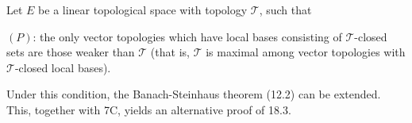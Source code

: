 Let $E$ be a linear topological space with topology $\mathcal{T}$, such that

$(P)$: the only vector topologies which have local bases consisting of $\mathcal{T}$-closed sets are those weaker than $\mathcal{T}$ (that is, $\mathcal{T}$ is maximal among vector topologies with $\mathcal{T}$-closed local bases).

Under this condition, the Banach-Steinhaus theorem (12.2) can be extended. This, together with 7C, yields an alternative proof of 18.3.
